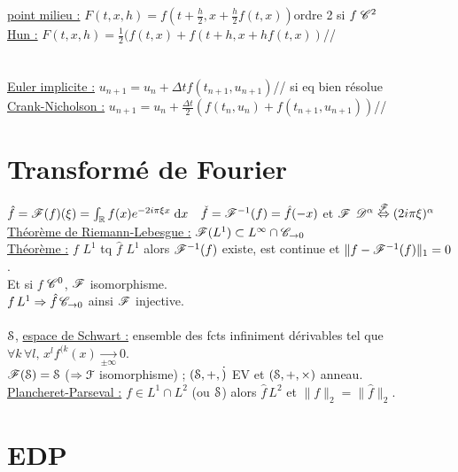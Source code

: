 \documentclass[12 pt]{exampleclass}
\begin{document}
\underline{point milieu :} $F(t,x,h) = f(t+\frac{h}{2}, x+\frac{h}{2}f(t,x))$\qquad  ordre 2 si $f \; \mathscr{C}^2$\\
\underline{Hun :} $F(t,x,h) = \frac{1}{2} (f(t,x) + f(t+h,x+hf(t,x))$\qquad  //\\
\text{}\\
\text{}\\
\underline{Euler implicite :} $u_{n+1} = u_n + \Delta tf(t_{n+1},u_{n+1})$\qquad  // si eq bien résolue\\
\underline{Crank-Nicholson :} $u_{n+1} = u_n + \frac{\Delta t}{2}(f(t_n,u_n) + f(t_{n+1},u_{n+1}))$\qquad  //\\


\section{Transformé de Fourier}
$\hat{f}=\mathscr{F}(f)(\xi) = \int_{\mathbb{R}} f(x) e^{-2i\pi \xi x} \; \text{d}x$ \ $\check{f}=\mathscr{F}^{-1}(f) = \hat{f}(-x)$ et $\mathscr{F}$ \quad $\mathscr{D}^\alpha \overset{\mathscr{F}}{\Leftrightarrow} (2i\pi\xi)^\alpha$\\
\underline{Théorème de Riemann-Lebesgue :} $\mathscr{F}(L^1) \subset L^\infty \cap \mathscr{C}_{\to 0}$\\
\underline{Théorème :} $f$ $L^1$ tq $\hat{f}$ $L^1$ alors $\mathscr{F}^{-1}(f)$ existe, est continue et $\| f - \mathscr{F}^{-1}(f)\|_1 = 0$.\\ Et si $f$ $\mathscr{C}^0$, $\mathscr{F}$ isomorphisme.\\
$f \, L^1 \Rightarrow \hat{f} \, \mathscr{C}_{\rightarrow 0}$ ainsi $\mathscr{F}$ injective.\\
\\
$\mathcal{S}$, \underline{espace de Schwart :} ensemble des fcts infiniment dérivables tel que $\forall k\,\forall l,\, x^l f^{(k}(x) \underset{\pm\infty}{\longrightarrow} 0$.\\
$\mathscr{F}(\mathcal{S})=\mathcal{S}$ ($\Rightarrow \mathcal{F}$ isomorphisme) ; $(\mathcal{S}, +, \dot)$ EV et $(\mathcal{S},+,\times)$ anneau.\\
\underline{Plancheret-Parseval :} $f\in L^1\cap L^2$ (ou $\mathcal{S}$) alors $\hat{f}\, L^2$ et $\|f\|_2 = \|\hat{f}\|_2$.\\

\section{EDP}
\end{document}
